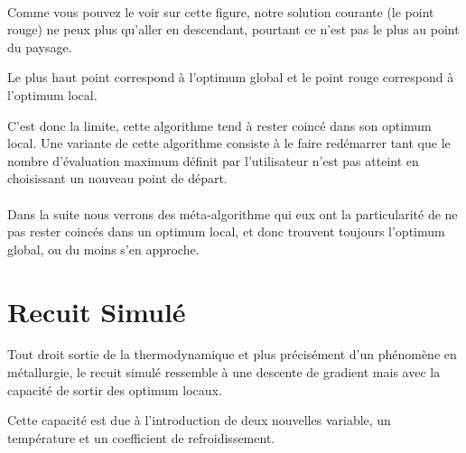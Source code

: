 \documentclass[a4paper]{article}
\begin{document}
	\noindent%
	\begin{minipage}{\linewidth}%
	\label{hc}%
	\end{minipage}\\

	Comme vous pouvez le voir sur cette figure, notre solution courante (le point rouge) ne peux plus qu'aller en descendant, pourtant ce n'est pas le plus au point du paysage.

	Le plus haut point correspond à l'optimum global et le point rouge correspond à l'optimum local.

	C'est donc la limite, cette algorithme tend à rester coincé dans son optimum local. Une variante de cette algorithme consiste à le faire redémarrer tant que le nombre d'évaluation maximum définit par l'utilisateur n'est pas atteint en choisissant un nouveau point de départ.\\\\

	Dans la suite nous verrons des méta-algorithme qui eux ont la particularité de ne pas rester coincés dans un optimum local, et donc trouvent toujours l'optimum global, ou du moins s'en approche.
\section{Recuit Simulé}
Tout droit sortie de la thermodynamique et plus précisément d'un phénomène en métallurgie, le recuit simulé ressemble à une descente de gradient mais avec la capacité de sortir des optimum locaux.

Cette capacité est due à l'introduction de deux nouvelles variable, un température et un coefficient de refroidissement.
\end{document}
